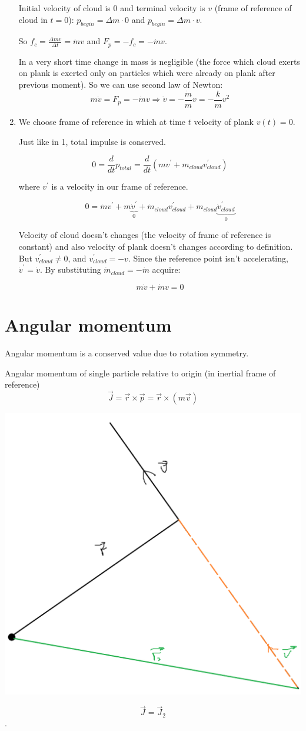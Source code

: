 \begin{enumerate}
	Initial velocity of cloud is 0 and terminal velocity is $v$ (frame of reference  of cloud in $t=0$): $p_{begin} = \Delta m \cdot 0$ and  $p_{begin} = \Delta m \cdot v$.
	
	So $f_c= \frac{\Delta m v}{\Delta t} = \dot{m}v$ and $F_{p} = -f_c  = - \dot{m}v$.
	
	In a very short time change in mass is negligible (the force which cloud exerts on plank is exerted only on particles which were already on plank after previous moment). So we can use second law of Newton:
	$$m \dot{v} = F_{p} = -\dot{m}v \Rightarrow \dot{v} = -\frac{\dot{m}}{m}v = -\frac{k}{m} v^2$$
	\item We choose frame of reference in which at time $t$ velocity of plank $v(t) =  0$.
	
	Just like in 1, total impulse is conserved.
	
	$$0 = \frac{d}{dt}p_{total} = \frac{d}{dt} \left( m v^\prime + m_{cloud} v^\prime_{cloud} \right)$$
	
	where $v^\prime$ is a velocity in our frame of reference.
	
	$$0 = \dot{m} v^\prime + m\underbrace{\dot{v}^\prime}_{0} + \dot{m}_{cloud} v^\prime_{cloud} + m_{cloud}\underbrace{ \dot{v}^\prime_{cloud}}_{0}$$
	
	Velocity of cloud doesn't changes (the velocity of frame of reference is constant) and also velocity of plank doesn't changes according to definition. But $v^\prime_{cloud} \neq 0$, and $v^\prime_{cloud}  = -v$. Since the reference point isn't accelerating, $\dot{v}^\prime = \dot{v}$. By substituting $\dot{m}_{cloud} = -\dot{m}$  acquire:
	
	$$m\dot{v} + \dot{m}v = 0$$
\end{enumerate}	
	
\section{Angular momentum}

Angular momentum is a conserved value due to rotation symmetry.

Angular momentum of single particle relative to origin (in inertial frame of reference) $$\vec{J} = \vec{r} \times \vec{p} = \vec{r} \times \left( m \vec{v} \right)$$


\begin{center}
	\includegraphics[width=0.2\linewidth]{./lect13/pic2.png}
\end{center}


$$\vec{J}=\vec{J}_2$$.
